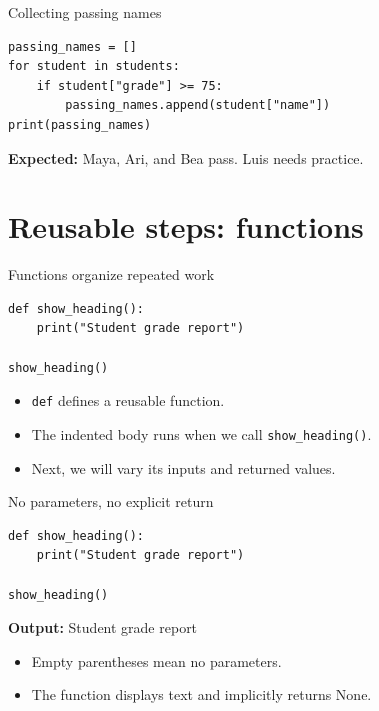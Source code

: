 \documentclass[aspectratio=169,12pt]{beamer}
\begin{document}
\begin{frame}[fragile]{Collecting passing names}
\begin{lstlisting}
passing_names = []
for student in students:
    if student["grade"] >= 75:
        passing_names.append(student["name"])
print(passing_names)
\end{lstlisting}
\textbf{Expected:} Maya, Ari, and Bea pass. Luis needs practice.

\end{frame}
\section{Reusable steps: functions}
\begin{frame}[fragile]{Functions organize repeated work}
\begin{lstlisting}
def show_heading():
    print("Student grade report")

show_heading()
\end{lstlisting}
\begin{itemize}
\item \texttt{def} defines a reusable function.
\item The indented body runs when we call \texttt{show\_heading()}.
\item Next, we will vary its inputs and returned values.
\end{itemize}

\end{frame}
\begin{frame}[fragile]{No parameters, no explicit return}
\begin{lstlisting}
def show_heading():
    print("Student grade report")

show_heading()
\end{lstlisting}
\textbf{Output:} Student grade report
\begin{itemize}
\item Empty parentheses mean no parameters.
\item The function displays text and implicitly returns None.
\end{itemize}

\end{frame}
\end{document}
